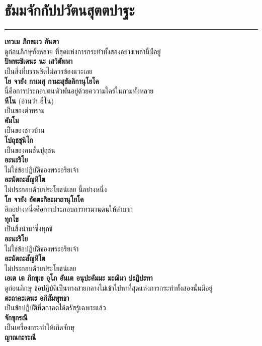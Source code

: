 \documentclass[12pt]{article}
\begin{document}
\section{ธัมมจักกัปปวัตนสุตตปาฐะ}
\hrule
\textbf{เทวเม ภิกขะเว อันตา}\\
\indent ดูก่อนภิกษุทั้งหลาย   ที่สุดแห่งการกระทำทั้งสองอย่างเหล่านี้มีอยู่\\
\textbf{ปัพพะชิเตนะ นะ เสวิตัพพา}\\
\indent เป็นสิ่งที่บรรพชิตไม่ควรข้องแวะเลย\\
\textbf{โย จายัง กาเมสุ กามะสุขัลลิกานุโยโค}\\
\indent นี้คือการประกอบตนพัวพันอยู่ด้วยคววามใคร่ในกามทั้งหลาย\\
\textbf{หีโน} (อ่านว่า ฮีโน)\\
\indent เป็นของต่ำทราม\\
\textbf{คัมโม}\\
\indent เป็นของชาวบ้าน\\
\textbf{โปถุชชุนิโก}\\
\indent เป็นของคนชั้นปุถุชน\\
\textbf{อะนะริโย}\\
\indent ไม่ใช่ข้อปฏิบัติของพระอริยเจ้า\\
\textbf{อะนัตถะสัญหิโต}\\
\indent ไม่ประกอบด้วยประโยชน์เลย นี้อย่างหนึ่ง\\
\textbf{โย จายัง อัตตะกิละมาถานุโยโค}\\
\indent อีกอย่างหนึ่งคือการประกอบการทรมานตนให้ลำบาก\\
\textbf{ทุกโข}\\
\indent เป็นสิ่งนำมาซึ่งทุกข์\\
\textbf{อะนะริโย}\\
\indent ไม่ใช่ข้อปฏิบัติของพระอริยเจ้า\\
\textbf{อะนัตถะสัญหิโต}\\
\indent ไม่ประกอบด้วยประโยชน์เลย\\
\textbf{เอเต เต ภิกขุเข อุโภ อันเต อนุปะคัมมะ มะฌิมา ปะฏิปะทา}\\
\indent ดูก่อนภิกษุ ข้อปฏิบัติเป็นทางสายกลางไม่เข้าไปหาที่สุดแห่งการกระทำทั้งสองนั้นมีอยู่\\
\textbf{ตะถาคะเตนะ อภิสัมพุทธา}\\
\indent เป็นข้อปฏิบัติที่ตถาคตได้ตรัสรู้เฉพาะแล้ว\\
\textbf{จักขุกรณี}\\
\indent เป็นเครื่องกระทำให้เกิดจักษุ\\
\textbf{ญาณกะระณี}\\
\end{document}
